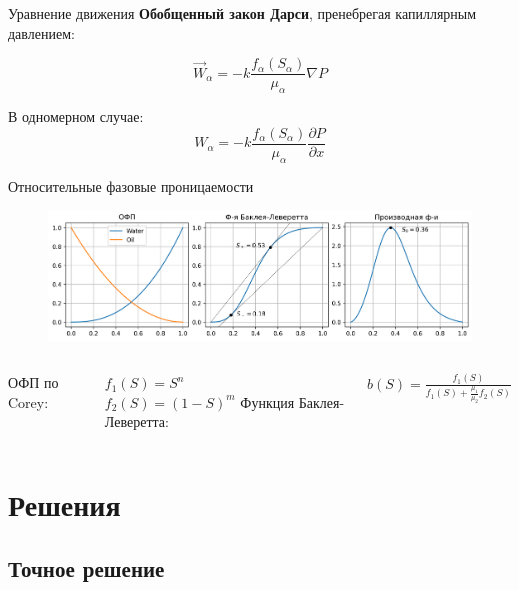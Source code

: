\documentclass[14pt, aspectratio=169]{beamer}
\begin{document}
\begin{frame}{Уравнение движения}
    \textbf{Обобщенный закон Дарси}, пренебрегая капиллярным давлением:

    $$
    \vec{W}_{\alpha} = - k \frac{f_{\alpha}(S_{\alpha})}{\mu_{\alpha}} \nabla P
    $$

    В одномерном случае:
    $$
    W_{\alpha} = - k \frac{f_{\alpha}(S_{\alpha})}{\mu_{\alpha}} \frac{\partial P}{\partial x}
    $$

\end{frame}


\begin{frame}{Относительные фазовые проницаемости}
    
    \begin{figure}
        \includegraphics[width=0.9\linewidth]{buckley-leverett-plot.png}
    \end{figure}

    \begin{columns}
        ОФП по Corey:

        $
        f_1(S) = S^{n}$ \\ $
        f_2(S) = (1 - S)^{m}
        $
        Функция Баклея-Леверетта:

        $
        b(S) = \frac{f_1(S)}{f_1(S) + \frac{\mu_1}{\mu_2} {f_2(S)}}
        $
    \end{columns}
    

\end{frame}

\section{Решения}
\subsection{Точное решение}
\end{document}
